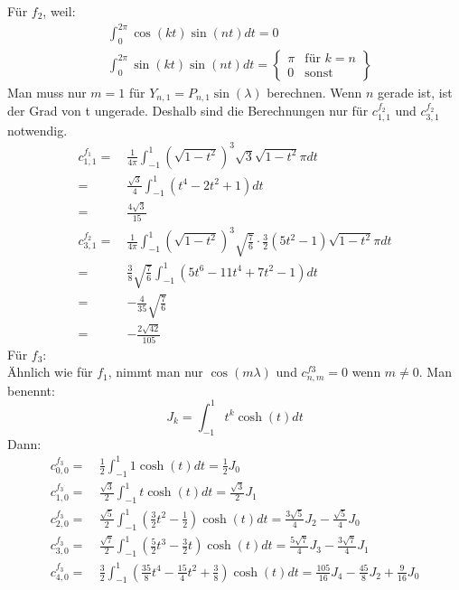 Für $f_2$, weil:
\begin{align}
	& \int_{0}^{2\pi}\cos(kt)\sin(nt)dt = 0 \\
	& \int_{0}^{2\pi}\sin(kt)\sin(nt)dt = \begin{Bmatrix}
	\pi & \text{für  } k=n \\
	0 &\text{sonst}
	\end{Bmatrix}
\end{align}
Man muss nur $m=1$ für $Y_{n,1} = P_{n,1}\sin(\lambda)$ berechnen. Wenn $n$ gerade ist, ist der Grad von t ungerade. Deshalb sind die Berechnungen nur für $c_{1,1}^{f_2}$ und $c_{3,1}^{f_2}$ notwendig.
\begin{align}
	c_{1,1}^{f_1} = \ & \frac{1}{4\pi}\int_{-1}^{1}(\sqrt{1-t^2})^3\sqrt{3}\sqrt{1-t^2}\pi dt\\
	= \ & \frac{\sqrt{3}}{4} \int_{-1}^{1} (t^4 - 2t^2 +1)dt \\
	= \ & \frac{4\sqrt{3}}{15} \\
	c_{3,1}^{f_2} = \ & \frac{1}{4\pi}\int_{-1}^{1}(\sqrt{1-t^2})^3\sqrt{\frac{7}{6}}\cdot \frac{3}{2}(5t^2-1)\sqrt{1-t^2} \pi dt \\
	= \ & \frac{3}{8}\sqrt{\frac{7}{6}}\int_{-1}^{1}(5t^6 - 11t^4 + 7t^2-1) dt \\
	= \ & -\frac{4}{35} \sqrt{\frac{7}{6}} \\ 
	= \ & -\frac{2\sqrt{42}}{105}
\end{align}
Für $f_3$:\\
Ähnlich wie für $f_1$, nimmt man nur $\cos(m\lambda)$ und $c_{n,m}^{f3} = 0$ wenn $m \neq 0$. Man benennt:
\begin{equation*}
	J_k = \int_{-1}^{1} t^k \cosh (t) dt
\end{equation*}
Dann:
\begin{align}
	c_{0,0}^{f_3} = \ & \frac{1}{2} \int_{-1}^{1} 1 \cosh (t) dt = \frac{1}{2} J_0 \\
	c_{1,0}^{f_3} = \ & \frac{\sqrt{3}}{2} \int_{-1}^{1} t \cosh (t) dt = \frac{\sqrt{3}}{2}J_1 \\
	c_{2,0}^{f_3} = \ & \frac{\sqrt{5}}{2} \int_{-1}^{1} (\frac{3}{2}t^2-\frac{1}{2})\cosh (t) dt = \frac{3\sqrt{5}}{4}J_2-\frac{\sqrt{5}}{4} J_0 \\
	c_{3,0}^{f_3} = \ & \frac{\sqrt{7}}{2} \int_{-1}^{1} (\frac{5}{2}t^3 - \frac{3}{2}t)\cosh (t) dt = \frac{5\sqrt{7}}{4}J_3 - \frac{3\sqrt{7}}{4} J_1 \\
	c_{4,0}^{f_3} = \ & \frac{3}{2} \int_{-1}^{1} (\frac{35}{8}t^4 - \frac{15}{4}t^2 + \frac{3}{8}) \cosh (t) dt = \frac{105}{16}J_4 - \frac{45}{8}J_2 + \frac{9}{16}J_0 \\
\end{align}
